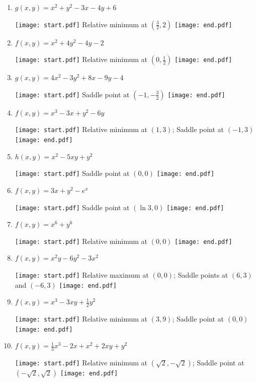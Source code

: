 \documentclass[12pt]{article}
\begin{document}
\begin{enumerate}

\item $g(x,y)=x^2+y^2-3x-4y+6$ 

\texttt{[image: start.pdf]}
{{Relative minimum at $\left(\frac{3}{2},2\right)$ }}
\texttt{[image: end.pdf]}


\item $f(x,y)=x^2+4y^2-4y-2$ 

\texttt{[image: start.pdf]}
{{Relative minimum at $\left(0,\frac{1}{2}\right)$}}
\texttt{[image: end.pdf]}


\item $g(x,y)=4x^2-3y^2+8x-9y-4$ 

\texttt{[image: start.pdf]}
{{Saddle point at $\left(-1,-\frac{3}{2}\right)$}}
\texttt{[image: end.pdf]}


\item $f(x,y)=x^3-3x+y^2-6y$

\texttt{[image: start.pdf]}
{{Relative minimum at $(1,3)$; Saddle point at $(-1,3)$}}
\texttt{[image: end.pdf]}


\item $h(x,y)=x^2-5xy+y^2$ 

\texttt{[image: start.pdf]}
{{Saddle point at $(0,0)$}}
\texttt{[image: end.pdf]}


\item $f(x,y)=3x+y^2-e^x$

\texttt{[image: start.pdf]}
{{Saddle point at $(\ln{3},0)$}}
\texttt{[image: end.pdf]}


\item $f(x,y)=x^6+y^6$

\texttt{[image: start.pdf]}
{{Relative minimum at $(0,0)$}}
\texttt{[image: end.pdf]}


\item $f(x,y)=x^2y-6y^2-3x^2$

\texttt{[image: start.pdf]}
{{Relative maximum at $(0,0)$; Saddle points at $(6,3)$ and $(-6,3)$}}
\texttt{[image: end.pdf]}


\item $f(x,y)=x^3-3xy+\frac{1}{2}y^2$

\texttt{[image: start.pdf]}
{{Relative minimum at $(3,9)$; Saddle point at $(0,0)$}}
\texttt{[image: end.pdf]}


\item $f(x,y)=\frac{1}{3}x^3-2x+x^2+2xy+y^2$

\texttt{[image: start.pdf]}
{{Relative minimum at $\left(\sqrt{2},-\sqrt{2}\right)$; Saddle point at $\left(-\sqrt{2},\sqrt{2}\right)$}}
\texttt{[image: end.pdf]}



\end{enumerate}
\end{document}
